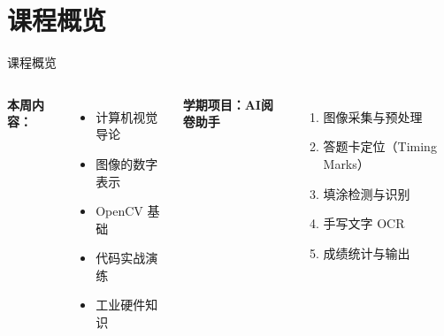 \documentclass[aspectratio=169, 10pt]{beamer}
\begin{document}
\section*{课程概览}
\begin{frame}{课程概览}
    \begin{columns}
        \textbf{本周内容：}
        \begin{itemize}
            \item 计算机视觉导论
            \item 图像的数字表示
            \item OpenCV 基础
            \item 代码实战演练
            \item 工业硬件知识
        \end{itemize}

        \textbf{学期项目：AI阅卷助手}
        \begin{enumerate}
            \item 图像采集与预处理
            \item 答题卡定位（Timing Marks）
            \item 填涂检测与识别
            \item 手写文字 OCR
            \item 成绩统计与输出
        \end{enumerate}
    \end{columns}
\end{frame}
\end{document}
